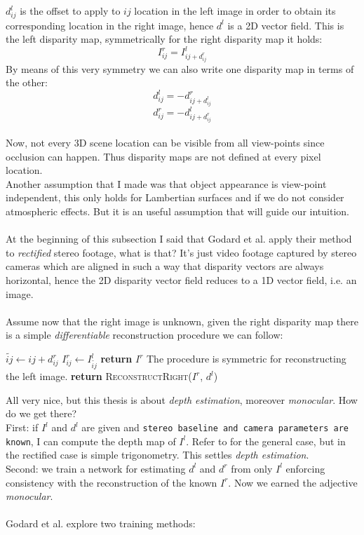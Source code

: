 $d^{l}_{ij}$ is the offset to apply to $ij$ location in the left image in order to obtain its corresponding location in the right image, hence $d^{l}$ is a 2D vector field. This is the left disparity map, symmetrically for the right disparity map it holds:
\[
	I^{r}_{ij} = I^{l}_{ij + d^{r}_{ij}}
\]
By means of this very symmetry we can also write one disparity map in terms of the other:
\[
d^{l}_{ij} = - d^{r}_{ij + d_{ij}^{l}}
\]\[
d^{r}_{ij} = - d^{l}_{ij + d_{ij}^{r}}
\]
\\
Now, not every 3D scene location can be visible from all view-points since occlusion can happen. Thus disparity maps are not defined at every pixel location.\\
Another assumption that I made was that object appearance is view-point independent, this only holds for Lambertian surfaces and if we do not consider atmospheric effects. But it is an useful assumption that will guide our intuition.\\
\\
At the beginning of this subsection I said that Godard et al. apply their method to \textit{rectified} stereo footage, what is that? It's just video footage captured by stereo cameras which are aligned in such a way that disparity vectors are always horizontal, hence the 2D disparity vector field reduces to a 1D vector field, i.e. an image.\\
\\
Assume now that the right image is unknown, given the right disparity map there is a simple \textit{differentiable} reconstruction procedure we can follow:\\

\begin{algorithmic}
			\State $\tilde{ij} \gets ij + d^{r}_{ij}$
			\State $I^{r}_{ij} \gets I^{l}_{\tilde{ij}}$ 
		\EndIf
	\EndFor
	\State \textbf{return} $I^{r}$
\EndFunction
\Statex
\Statex The procedure is symmetric for reconstructing the left image.
\Statex
{}
	\State \textbf{return}  \textsc{ReconstructRight}($I^{r}$, $d^{l}$)
\EndFunction
\Statex
\end{algorithmic}

All very nice, but this thesis is about \textit{depth estimation}, moreover \textit{monocular}. How do we get there?\\
First: if $I^{l}$ and $d^{l}$ are given and \texttt{stereo baseline and camera parameters are known}, I can compute the depth map of $I^{l}$. Refer to \cite{multiview} for the general case, but in the rectified case is simple trigonometry. This settles \textit{depth estimation}. \\
Second: we train a network for estimating $d^{l}$ and $d^{r}$ from only $I^{l}$ enforcing consistency with the reconstruction of the known $I^{r}$. Now we earned the adjective \textit{monocular}.\\
\\
Godard et al. explore two training methods:\\

